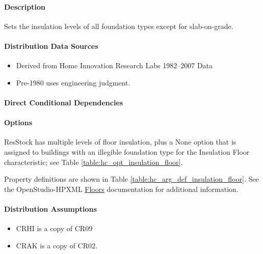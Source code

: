 \paragraph{Description}
% 
Sets the insulation levels of all foundation types except for slab-on-grade.

\paragraph{Distribution Data Sources}
% 
\begin{itemize}

\item
  Derived from Home Innovation Research Labs 1982--2007 Data
\item
  Pre-1980 uses engineering judgment.
\end{itemize}

\paragraph{Direct Conditional Dependencies}


\paragraph{Options}
ResStock has multiple levels of floor insulation, plus a None option that is assigned to buildings with an illegible foundation type for the Insulation Floor characteristic; see Table \ref{table:hc_opt_insulation_floor}.



Property definitions are shown in Table \ref{table:hc_arg_def_insulation_floor}. See the OpenStudio-HPXML \href{https://openstudio-hpxml.readthedocs.io/en/v1.10.0/workflow_inputs.html#hpxml-floors}{Floors} documentation for additional information.



\paragraph{Distribution Assumptions}
% 
\begin{itemize}

\item
  CRHI is a copy of CR09
\item
  CRAK is a copy of CR02.
\end{itemize}
